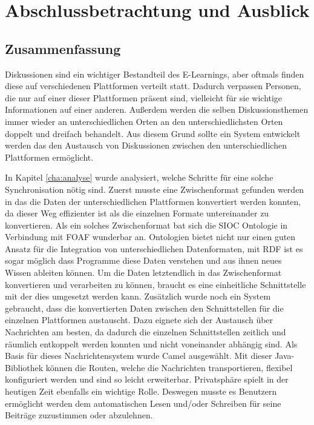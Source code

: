 
\chapter{Abschlussbetrachtung und Ausblick} %
\label{cha:zusammenfassung_und_ausblick}


\section{Zusammenfassung} %
\label{sec:zusammenfassung} 

Diskussionen sind ein wichtiger Bestandteil des E-Learnings, aber oftmals finden diese auf verschiedenen Plattformen verteilt statt. Dadurch verpassen Personen, die nur auf einer dieser Plattformen präsent sind, vielleicht für sie wichtige Informationen auf einer anderen. Außerdem werden die selben Diskussionsthemen immer wieder an unterschiedlichen Orten an den unterschiedlichsten Orten doppelt und dreifach behandelt. Aus diesem Grund sollte ein System entwickelt werden das den Austausch von Diskussionen zwischen den unterschiedlichen Plattformen ermöglicht. 

In Kapitel \ref{cha:analyse} wurde analysiert, welche Schritte für eine solche Synchronisation nötig sind. Zuerst musste eine Zwischenformat gefunden werden in das die Daten der unterschiedlichen Plattformen konvertiert werden konnten, da dieser Weg effizienter ist als die einzelnen Formate untereinander zu konvertieren. Als ein solches Zwischenformat bat sich die SIOC Ontologie in Verbindung mit FOAF wunderbar an. Ontologien bietet nicht nur einen guten Ansatz für die Integration von unterschiedlichen Datenformaten, mit RDF ist es sogar möglich dass Programme diese Daten verstehen und aus ihnen neues Wissen ableiten können. Um die Daten letztendlich in das Zwischenformat konvertieren und verarbeiten zu können, braucht es eine einheitliche Schnittstelle mit der dies umgesetzt werden kann. Zusätzlich wurde noch ein System gebraucht, dass die konvertierten Daten zwischen den Schnittstellen für die einzelnen Plattformen austauscht. Dazu eignete sich der Austausch über Nachrichten am besten, da dadurch die einzelnen Schnittstellen zeitlich und räumlich entkoppelt werden konnten und nicht voneinander abhängig sind. Als Basis für dieses Nachrichtensystem wurde Camel ausgewählt. Mit dieser Java-Bibliothek können die Routen, welche die Nachrichten transportieren, flexibel konfiguriert werden und sind so leicht erweiterbar. Privatsphäre spielt in der heutigen Zeit ebenfalls ein wichtige Rolle. Deswegen musste es Benutzern ermöglicht werden dem automatischen Lesen und/oder Schreiben für seine Beiträge zuzustimmen oder abzulehnen.

